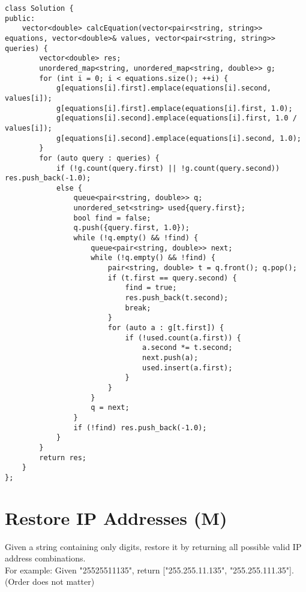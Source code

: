 \begin{lstlisting}
class Solution {
public:
    vector<double> calcEquation(vector<pair<string, string>> equations, vector<double>& values, vector<pair<string, string>> queries) {
        vector<double> res;
        unordered_map<string, unordered_map<string, double>> g;
        for (int i = 0; i < equations.size(); ++i) {
            g[equations[i].first].emplace(equations[i].second, values[i]);
            g[equations[i].first].emplace(equations[i].first, 1.0);
            g[equations[i].second].emplace(equations[i].first, 1.0 / values[i]);
            g[equations[i].second].emplace(equations[i].second, 1.0);
        }
        for (auto query : queries) {
            if (!g.count(query.first) || !g.count(query.second)) res.push_back(-1.0);
            else {
                queue<pair<string, double>> q;
                unordered_set<string> used{query.first};
                bool find = false;
                q.push({query.first, 1.0});
                while (!q.empty() && !find) {
                    queue<pair<string, double>> next;
                    while (!q.empty() && !find) {
                        pair<string, double> t = q.front(); q.pop();
                        if (t.first == query.second) {
                            find = true;
                            res.push_back(t.second);
                            break;
                        }
                        for (auto a : g[t.first]) {
                            if (!used.count(a.first)) {
                                a.second *= t.second;
                                next.push(a);
                                used.insert(a.first);
                            }
                        }
                    }
                    q = next;
                }
                if (!find) res.push_back(-1.0);
            }
        }
        return res;
    }
};
\end{lstlisting}


\section{Restore IP Addresses (M)}
Given a string containing only digits, restore it by returning all possible valid IP address combinations.\\

For example:
Given "25525511135",
return ["255.255.11.135", "255.255.111.35"]. (Order does not matter) \\

